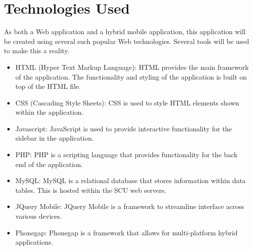 \chapter{Technologies Used}
As both a Web application and a hybrid mobile application, this application will be created using several such popular Web technologies. Several tools will be used to make this a reality.

\begin{itemize}
	\item HTML (Hyper Text Markup Language): HTML provides the main framework of the application. The functionality and styling of the application is built on top of the HTML file.
	\item CSS (Cascading Style Sheets): CSS is used to style HTML elements shown within the application.
	\item Javascript: JavaScript is used to provide interactive functionality for the sidebar in the application.
	\item PHP: PHP is a scripting language that provides functionality for the back end of the application.
	\item MySQL: MySQL is a relational database that stores information within data tables. This is hosted within the SCU web servers.
	\item JQuery Mobile: JQuery Mobile is a framework to streamline interface across various devices.
	\item Phonegap: Phonegap is a framework that allows for multi-platform hybrid applications.
\end{itemize}
